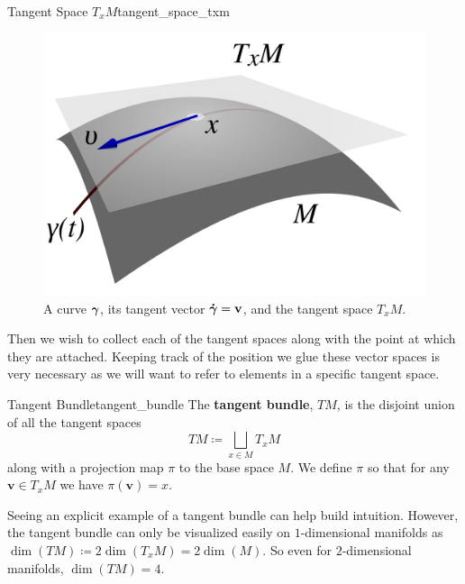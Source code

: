 
\begin{fig}{Tangent Space $T_xM$}{tangent_space_txm}
\begin{figure}[H]
    \centering
    \includegraphics[width=.4\textwidth]{TACA_2019/tangent_space.png}
    \caption{A curve $\boldsymbol{\gamma}$, its tangent vector $\boldsymbol{\dot{\gamma}}=\mathbf{v}$, and the tangent space $T_xM$.}
    \label{fig:tangent_space}
\end{figure}
\end{fig}

Then we wish to collect each of the tangent spaces along with the point at which they are attached.  Keeping track of the position we glue these vector spaces is very necessary as we will want to refer to elements in a specific tangent space.

\begin{df}{Tangent Bundle}{tangent_bundle}
The \textbf{tangent bundle}, $TM$, is the disjoint union of all the tangent spaces
\[
TM\coloneqq \bigsqcup_{x\in M} T_xM
\]
along with a projection map $\pi$ to the base space $M$.  We define $\pi$ so that for any $\mathbf{v}\in T_xM$ we have $\pi(\mathbf{v})=x$. 
\end{df}

Seeing an explicit example of a tangent bundle can help build intuition.  However, the tangent bundle can only be visualized easily on $1$-dimensional manifolds as $\dim(TM)\coloneqq 2\dim(T_xM)=2\dim(M)$. So even for $2$-dimensional manifolds, $\dim(TM)=4$. 

